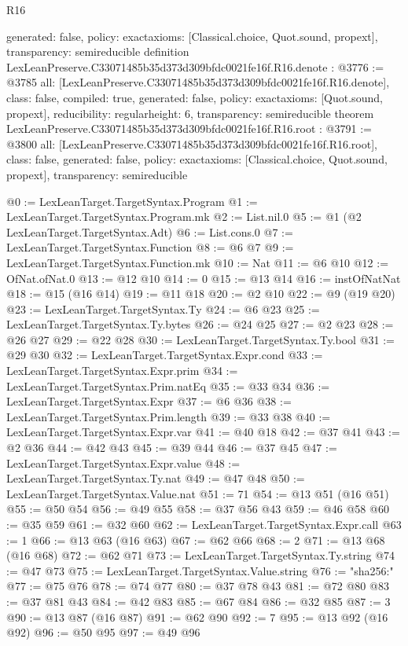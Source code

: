 \begin{lexlean}{R16}
\begin{coremodule}
{  generated: false,
  policy: exact{axioms: [Classical.choice, Quot.sound, propext]},
  transparency: semireducible
}
definition LexLeanPreserve.C33071485b35d373d309bfdc0021fe16f.R16.denote : @3776 := @3785 {
  all: [LexLeanPreserve.C33071485b35d373d309bfdc0021fe16f.R16.denote],
  class: false,
  compiled: true,
  generated: false,
  policy: exact{axioms: [Quot.sound, propext]},
  reducibility: regular{height: 6},
  transparency: semireducible
}
theorem LexLeanPreserve.C33071485b35d373d309bfdc0021fe16f.R16.root : @3791 := @3800 {
  all: [LexLeanPreserve.C33071485b35d373d309bfdc0021fe16f.R16.root],
  class: false,
  generated: false,
  policy: exact{axioms: [Classical.choice, Quot.sound, propext]},
  transparency: semireducible
}

@0 := LexLeanTarget.TargetSyntax.Program
@1 := LexLeanTarget.TargetSyntax.Program.mk
@2 := List.nil.{0}
@5 := @1 (@2 LexLeanTarget.TargetSyntax.Adt)
@6 := List.cons.{0}
@7 := LexLeanTarget.TargetSyntax.Function
@8 := @6 @7
@9 := LexLeanTarget.TargetSyntax.Function.mk
@10 := Nat
@11 := @6 @10
@12 := OfNat.ofNat.{0}
@13 := @12 @10
@14 := 0
@15 := @13 @14
@16 := instOfNatNat
@18 := @15 (@16 @14)
@19 := @11 @18
@20 := @2 @10
@22 := @9 (@19 @20)
@23 := LexLeanTarget.TargetSyntax.Ty
@24 := @6 @23
@25 := LexLeanTarget.TargetSyntax.Ty.bytes
@26 := @24 @25
@27 := @2 @23
@28 := @26 @27
@29 := @22 @28
@30 := LexLeanTarget.TargetSyntax.Ty.bool
@31 := @29 @30
@32 := LexLeanTarget.TargetSyntax.Expr.cond
@33 := LexLeanTarget.TargetSyntax.Expr.prim
@34 := LexLeanTarget.TargetSyntax.Prim.natEq
@35 := @33 @34
@36 := LexLeanTarget.TargetSyntax.Expr
@37 := @6 @36
@38 := LexLeanTarget.TargetSyntax.Prim.length
@39 := @33 @38
@40 := LexLeanTarget.TargetSyntax.Expr.var
@41 := @40 @18
@42 := @37 @41
@43 := @2 @36
@44 := @42 @43
@45 := @39 @44
@46 := @37 @45
@47 := LexLeanTarget.TargetSyntax.Expr.value
@48 := LexLeanTarget.TargetSyntax.Ty.nat
@49 := @47 @48
@50 := LexLeanTarget.TargetSyntax.Value.nat
@51 := 71
@54 := @13 @51 (@16 @51)
@55 := @50 @54
@56 := @49 @55
@58 := @37 @56 @43
@59 := @46 @58
@60 := @35 @59
@61 := @32 @60
@62 := LexLeanTarget.TargetSyntax.Expr.call
@63 := 1
@66 := @13 @63 (@16 @63)
@67 := @62 @66
@68 := 2
@71 := @13 @68 (@16 @68)
@72 := @62 @71
@73 := LexLeanTarget.TargetSyntax.Ty.string
@74 := @47 @73
@75 := LexLeanTarget.TargetSyntax.Value.string
@76 := "sha256:"
@77 := @75 @76
@78 := @74 @77
@80 := @37 @78 @43
@81 := @72 @80
@83 := @37 @81 @43
@84 := @42 @83
@85 := @67 @84
@86 := @32 @85
@87 := 3
@90 := @13 @87 (@16 @87)
@91 := @62 @90
@92 := 7
@95 := @13 @92 (@16 @92)
@96 := @50 @95
@97 := @49 @96

\end{coremodule}
\end{lexlean}
